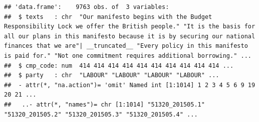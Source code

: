 \documentclass[
]{book}
\newenvironment{Shaded}{\begin{snugshade}}{\end{snugshade}}
\newcommand{\AttributeTok}[1]{\textcolor[rgb]{0.13,0.29,0.53}{#1}}
\newcommand{\CommentTok}[1]{\textcolor[rgb]{0.56,0.35,0.01}{\textit{#1}}}
\newcommand{\DecValTok}[1]{\textcolor[rgb]{0.00,0.00,0.81}{#1}}
\newcommand{\FunctionTok}[1]{\textcolor[rgb]{0.13,0.29,0.53}{\textbf{#1}}}
\newcommand{\NormalTok}[1]{#1}
\newcommand{\OtherTok}[1]{\textcolor[rgb]{0.56,0.35,0.01}{#1}}
\newcommand{\SpecialCharTok}[1]{\textcolor[rgb]{0.81,0.36,0.00}{\textbf{#1}}}
\newcommand{\StringTok}[1]{\textcolor[rgb]{0.31,0.60,0.02}{#1}}
\begin{document}
\begin{Shaded}
\end{Shaded}

\begin{verbatim}
## 'data.frame':    9763 obs. of  3 variables:
##  $ texts   : chr  "Our manifesto begins with the Budget Responsibility Lock we offer the British people." "It is the basis for all our plans in this manifesto because it is by securing our national finances that we are"| __truncated__ "Every policy in this manifesto is paid for." "Not one commitment requires additional borrowing." ...
##  $ cmp_code: num  414 414 414 414 414 414 414 414 414 414 ...
##  $ party   : chr  "LABOUR" "LABOUR" "LABOUR" "LABOUR" ...
##  - attr(*, "na.action")= 'omit' Named int [1:1014] 1 2 3 4 5 6 9 19 20 21 ...
##   ..- attr(*, "names")= chr [1:1014] "51320_201505.1" "51320_201505.2" "51320_201505.3" "51320_201505.4" ...
\end{verbatim}
\end{document}
